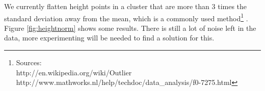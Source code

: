 We currently flatten height points in a cluster that are more than $3$ times the standard deviation away from the mean, which is a commonly used method\footnote{Sources:\\ http://en.wikipedia.org/wiki/Outlier\\ http://www.mathworks.nl/help/techdoc/data\_analysis/f0-7275.html} . Figure \ref{fig:heightnorm} shows some results. There is still a lot of noise left in the data, more experimenting will be needed to find a solution for this.




